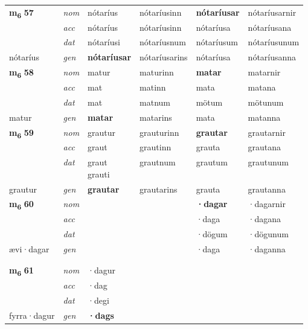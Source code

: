 \begin{longtable}[l]{X>{\footnotesize\itshape}XXXXX}
\multirow{3}{*}{{{\textbf{m{\textsubscript{6}}} \Large{\textbf{57}}}}} & nom & nótaríus & nótaríusinn & \textbf{nótaríusar} & nótaríusarnir \\*
 & acc & nótaríus & nótaríusinn & nótaríusa & nótaríusana \\*
 & dat & nótaríusi & nótaríusnum & nótaríusum & nótaríusunum \\*
 {\footnotesize{nótaríus}} & gen & \textbf{nótaríusar} & nótaríusarins & nótaríusa & nótaríusanna \\
\cmidrule{1-6}

\multirow{3}{*}{{{\textbf{m{\textsubscript{6}}} \Large{\textbf{58}}}}} & nom & matur & maturinn & \textbf{matar} & matarnir \\*
 & acc & mat & matinn & mata & matana \\*
 & dat & mat & matnum & mötum & mötunum \\*
 {\footnotesize{matur}} & gen & \textbf{matar} & matarins & mata & matanna \\
\cmidrule{1-6}

\multirow{3}{*}{{{\textbf{m{\textsubscript{6}}} \Large{\textbf{59}}}}} & nom & grautur & grauturinn & \textbf{grautar} & grautarnir \\*
 & acc & graut & grautinn & grauta & grautana \\*
 & dat & \specialcell{graut\\ grauti} & grautnum & grautum & grautunum \\*
 {\footnotesize{grautur}} & gen & \textbf{grautar} & grautarins & grauta & grautanna \\
\cmidrule{1-6}

\multirow{3}{*}{{{\textbf{m{\textsubscript{6}}} \Large{\textbf{60}}}}} & nom &  &  & \textbf{·dagar} & ·dagarnir \\*
 & acc &  &  & ·daga & ·dagana \\*
 & dat &  &  & ·dögum & ·dögunum \\*
 {\footnotesize{ævi\allowbreak ·dagar}} & gen & \textbf{} &  & ·daga & ·daganna \\*
 &  &  &  &  &  \\*
 &  &  &  &  & \\
 
\multirow{3}{*}{{{\textbf{m{\textsubscript{6}}} \Large{\textbf{61}}}}} & nom & ·dagur &  & \textbf{} &  \\*
 & acc & ·dag &  &  &  \\*
 & dat & ·degi &  &  &  \\*
 {\footnotesize{fyrra\allowbreak ·dagur}} & gen & \textbf{·dags} &  &  &  \\
\cmidrule{1-6}


\end{longtable}
